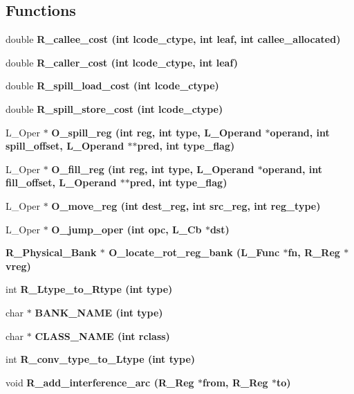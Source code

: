 \subsection*{Functions}
\begin{CompactItemize}
\item 
double \bf{R\_\-callee\_\-cost} (int lcode\_\-ctype, int leaf, int callee\_\-allocated)
\item 
double \bf{R\_\-caller\_\-cost} (int lcode\_\-ctype, int leaf)
\item 
double \bf{R\_\-spill\_\-load\_\-cost} (int lcode\_\-ctype)
\item 
double \bf{R\_\-spill\_\-store\_\-cost} (int lcode\_\-ctype)
\item 
L\_\-Oper $\ast$ \bf{O\_\-spill\_\-reg} (int reg, int type, L\_\-Operand $\ast$operand, int spill\_\-offset, L\_\-Operand $\ast$$\ast$pred, int type\_\-flag)
\item 
L\_\-Oper $\ast$ \bf{O\_\-fill\_\-reg} (int reg, int type, L\_\-Operand $\ast$operand, int fill\_\-offset, L\_\-Operand $\ast$$\ast$pred, int type\_\-flag)
\item 
L\_\-Oper $\ast$ \bf{O\_\-move\_\-reg} (int dest\_\-reg, int src\_\-reg, int reg\_\-type)
\item 
L\_\-Oper $\ast$ \bf{O\_\-jump\_\-oper} (int opc, L\_\-Cb $\ast$dst)
\item 
\bf{R\_\-Physical\_\-Bank} $\ast$ \bf{O\_\-locate\_\-rot\_\-reg\_\-bank} (L\_\-Func $\ast$fn, \bf{R\_\-Reg} $\ast$vreg)
\item 
int \bf{R\_\-Ltype\_\-to\_\-Rtype} (int type)
\item 
char $\ast$ \bf{BANK\_\-NAME} (int type)
\item 
char $\ast$ \bf{CLASS\_\-NAME} (int rclass)
\item 
int \bf{R\_\-conv\_\-type\_\-to\_\-Ltype} (int type)
\item 
void \bf{R\_\-add\_\-interference\_\-arc} (\bf{R\_\-Reg} $\ast$from, \bf{R\_\-Reg} $\ast$to)
\end{CompactItemize}

